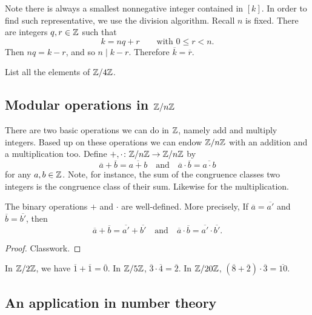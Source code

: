 \documentclass[11pt,a4paper]{article}
\begin{document}
Note
there is always  a smallest nonnegative integer contained in \([k]\).
In order to find such representative, we use the division algorithm.
Recall \(n\) is fixed.
There are integers \(q,r\in \mathbb{Z}\) such that 
\[k = nq + r\qquad\text{with } 0\leq r <n.\]
Then \(nq = k-r\), and so \(n \mid k-r\).
Therefore \(\overline{k} = \overline{r}\).

\begin{eje}
    List all the elements of \(\mathbb{Z}/ 4 \mathbb{Z}\).
\end{eje}


\subsection[]{Modular operations in \(\mathbb{Z}/ n \mathbb{Z}\)}

There are two basic operations we can do in \(\mathbb{Z}\), namely add and multiply integers.
Based up on these operations we can endow \(\mathbb{Z}/n \mathbb{Z}\) with an addition and a multiplication too.
Define \(+,\cdot\colon \mathbb{Z}/n\mathbb{Z} \to \mathbb{Z}/n\mathbb{Z}\) by 
\[\overline{a} + \overline{b} = \overline{a+b}
 \quad \text{and}\quad \overline{a} \cdot \overline{b} = \overline{a\cdot b}\]
for any \(a,b\in \mathbb{Z}\).
Note, for instance, the sum of the congruence classes two integers is  the congruence class of their sum.
Likewise for the multiplication.


\begin{teo}
    The binary operations \(+\) and \(\cdot\) are well-defined.
    More precisely,
    If \(\overline{a}=\overline{a'}\) and \(\overline{b}=\overline{b'}\), then 
    \[\overline{a} + \overline{b} = \overline{a'} + \overline{b'}\quad\text{and}\quad \overline{a} \cdot \overline{b} = \overline{a'} \cdot \overline{b'}.\]

\end{teo}

\begin{proof}
    Classwork.
\end{proof}

\begin{exa}
    In \(\mathbb{Z}/2\mathbb{Z}\), we have  \(\overline{1}+\overline{1} = \overline{0}  \).
    In \(\mathbb{Z}/5\mathbb{Z}\),\; \( \overline{3} \cdot \overline{4} = \overline{2}\).
    In \(\mathbb{Z}/20\mathbb{Z}\),\; \(\left( \overline{8} + \overline{2} \right)\cdot \overline{3} = \overline{10}\).
\end{exa}


\subsection{An application in number theory}
\end{document}
